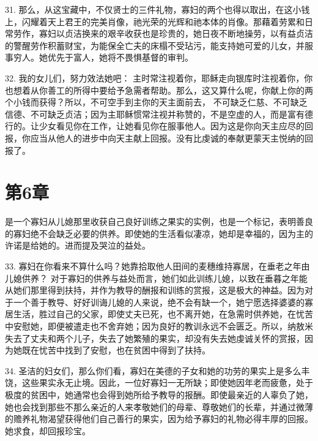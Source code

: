 31. 那么，从这宝藏中，不仅贤士的三件礼物，寡妇的两个也得以取出，在这小钱上，闪耀着天上君王的完美肖像，祂光荣的光辉和祂本体的肖像。那藉着劳累和日常劳作，寡妇以贞洁换来的艰辛收获也是珍贵的，她日夜不断地操劳，以有益贞洁的警醒劳作积蓄财宝，为能保全亡夫的床榻不受玷污，能支持她可爱的儿女，并服事穷人。她优先于富人，她将不畏惧基督的审判。\par

32. 我的女儿们，努力效法她吧：  主时常注视着你，耶稣走向银库时注视着你，你也想着从你善工的所得中要给予急需者帮助。那么，这又算什么呢，你献上你的两个小钱而获得？所以，不可空手到主你的天主面前去， 不可缺乏仁慈、不可缺乏信德、不可缺乏贞洁；因为主耶稣惯常注视并称赞的，不是空虚的人，而是富有德行的。让少女看见你在工作，让她看见你在服事他人。因为这是你向天主应尽的回报，你应当从他人的进步中向天主献上回报。没有比虔诚的奉献更蒙天主悦纳的回报了。\par


\section{第6章}

是一个寡妇从儿媳那里收获自己良好训练之果实的实例，也是一个标记，表明善良的寡妇绝不会缺乏必要的供养。即使她的生活看似凄凉，她却是幸福的，因为主的许诺是给她的。进而提及哭泣的益处。\par

33. 寡妇在你看来不算什么吗？她靠拾取他人田间的麦穗维持寡居，在垂老之年由儿媳供养？ 对于寡妇的供养与益处而言，她们如此训练儿媳，以致在垂暮之年能从她们那里得到扶持，并作为教导的酬报和训练的赏报，这是极大的神益。因为对于一个善于教导、好好训诲儿媳的人来说，绝不会有缺一个，她宁愿选择婆婆的寡居生活，胜过自己的父家，即使丈夫已死，也不离开她，在急需时供养她，在忧苦中安慰她，即便被遣走也不舍弃她；因为良好的教训永远不会匮乏。所以，纳敖米失去了丈夫和两个儿子，失去了她繁殖的果实，却没有失去她虔诚关怀的赏报，因为她既在忧苦中找到了安慰，也在贫困中得到了扶持。\par

34. 圣洁的妇女们，那么你们看，寡妇在美德的子女和她的功劳的果实上是多么丰饶，这些果实永无止境。因此，一位好寡妇一无所缺；即使她因年老而疲惫，处于极度的贫困中，她通常也会得到她所给予教导的报酬。即使最亲近的人辜负了她，她也会找到那些不那么亲近的人来孝敬她们的母辈、尊敬她们的长辈，并通过微薄的赡养礼物渴望获得他们自己善行的果实，因为给予寡妇的礼物必得丰厚的回报。她求食，却回报珍宝。\par

